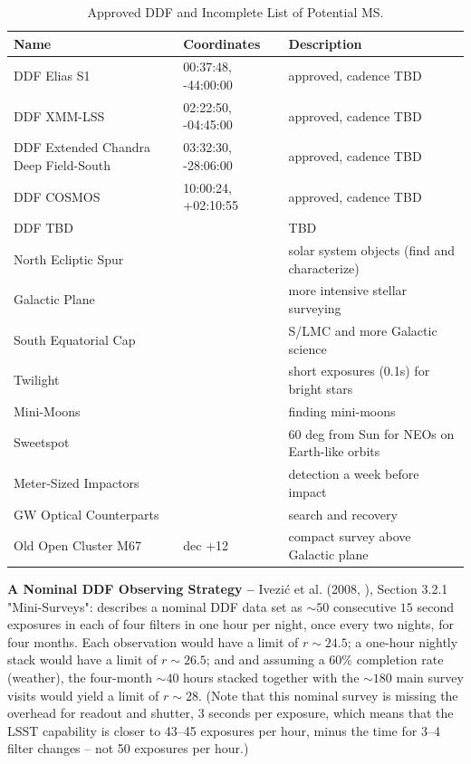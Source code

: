 \documentclass[DM,lsstdraft,toc]{lsstdoc}
\begin{document}
\begin{table}[h]
\begin{center}
\begin{footnotesize}
\caption{Approved DDF and Incomplete List of Potential MS.}
\label{tab:ddfms}
\begin{tabular}{lll}
\hline \hline
Name & Coordinates & Description  \\
\hline
DDF Elias S1    & 00:37:48, -44:00:00  & approved, cadence TBD \\
DDF XMM-LSS & 02:22:50, -04:45:00  & approved, cadence TBD  \\
DDF Extended Chandra Deep Field-South & 03:32:30, -28:06:00  & approved, cadence TBD  \\
DDF COSMOS  & 10:00:24, +02:10:55 & approved, cadence TBD  \\
DDF TBD  & & TBD \\
North Ecliptic Spur      & & solar system objects (find and characterize) \\
Galactic Plane             & & more intensive stellar surveying \\
South Equatorial Cap  & & S/LMC and more Galactic science \\
Twilight                        & & short exposures (0.1s) for bright stars \\
Mini-Moons                     &  & finding mini-moons \\
Sweetspot                       & & 60 deg from Sun for NEOs on Earth-like orbits \\
Meter-Sized Impactors     & & detection a week before impact \\
GW Optical Counterparts & & search and recovery \\
Old Open Cluster M67      & dec +12 & compact survey above Galactic plane  \\
\hline
\end{tabular}
\end{footnotesize}
\end{center}
\end{table}

\textbf{A Nominal DDF Observing Strategy -- } Ivezi\'{c} et al. (2008, \cite{2008arXiv0805.2366I}), Section 3.2.1 "Mini-Surveys": describes a nominal DDF data set as $\sim50$ consecutive $15$ second exposures in each of four filters in one hour per night, once every two nights, for four months. Each observation would have a limit of $r\sim24.5$; a one-hour nightly stack would have a limit of $r\sim26.5$; and and assuming a $60\%$ completion rate (weather), the four-month $\sim40$ hours stacked together with the $\sim180$ main survey visits would yield a limit of $r\sim28$. (Note that this nominal survey is missing the overhead for readout and shutter, 3 seconds per exposure, which means that the LSST capability is closer to 43--45 exposures per hour, minus the time for 3--4 filter changes -- not 50 exposures per hour.)
\end{document}
